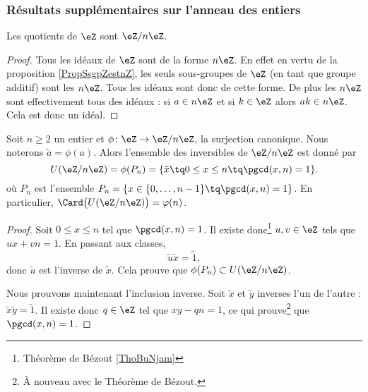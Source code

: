 \subsubsection{Résultats supplémentaires sur l'anneau des entiers}
\begin{corollary}
    Les quotients de \( \eZ\) sont \( \eZ/n\eZ\).
\end{corollary}

\begin{proof}
    Tous les idéaux de \( \eZ\) sont de la forme \( n\eZ\). En effet en vertu de la proposition \ref{PropSsgpZestnZ}, les seuls sous-groupes de \( \eZ\) (en tant que groupe additif) sont les \( n\eZ\). Tous les idéaux sont donc de cette forme. De plus les \( n\eZ\) sont effectivement tous des idéaux : si \( a\in n\eZ\) et si \( k\in \eZ\) alors \( ak\in n\eZ\). Cela est donc un idéal.
\end{proof}

\begin{proposition}     \label{PropZpintssiprempUzn}
    Soit \( n\geq 2\) un entier et \( \phi\colon \eZ\to \eZ/n\eZ\), la surjection canonique. Nous noterons \( \tilde a=\phi(a)\). Alors l'ensemble des inversibles de \( \eZ/n\eZ\) est donné par
    \begin{equation}
        U(\eZ/n\eZ)=\phi(P_n)=\{ \tilde x\tq 0\leq x\leq n\tq\pgcd(x,n)=1 \}.
    \end{equation}
    où \( P_n\) est l'ensemble $P_n=\{ x\in\{ 0,\ldots,n-1 \}\tq\pgcd(x,n)=1 \}$. En particulier, \( \Card\big( U(\eZ/n\eZ) \big)=\varphi(n)\).
\end{proposition}

\begin{proof}
    Soit \( 0\leq x\leq n\) tel que \( \pgcd(x,n)=1\). Il existe donc\footnote{Théorème de Bézout \ref{ThoBuNjam}} \( u,v\in\eZ\) tels que \( ux+vn=1\). En passant aux classes,
    \begin{equation}
        \tilde u\tilde x=\tilde 1,
    \end{equation}
    donc \( \tilde u\) est l'inverse de \( \tilde x\). Cela prouve que \( \phi(P_n)\subset U(\eZ/n\eZ)\).

    Nous prouvons maintenant l'inclusion inverse. Soit \( \tilde x\) et \( \tilde y\) inverses l'un de l'autre : $\tilde x\tilde y=\tilde 1$. Il existe donc \( q\in\eZ\) tel que \( xy-qn=1\), ce qui prouve\footnote{À nouveau avec le Théorème de Bézout.} que \( \pgcd(x,n)=1\).
\end{proof}

